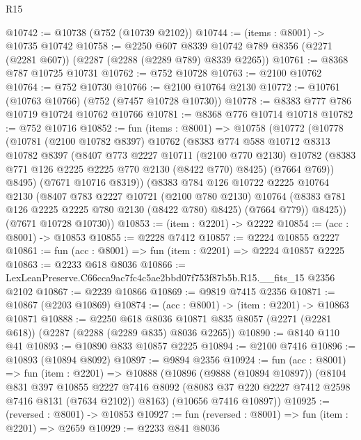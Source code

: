 \begin{lexlean}{R15}
\begin{coremodule}
@10742 := @10738 (@752 (@10739 @2102))
@10744 := (items : @8001) -> @10735 @10742
@10758 := @2250
    @607
    @8339
    @10742
    @789
    @8356
    (@2271 (@2281 @607))
    (@2287 (@2288 (@2289 @789) @8339 @2265))
@10761 := @8368 @787 @10725 @10731
@10762 := @752 @10728
@10763 := @2100 @10762
@10764 := @752 @10730
@10766 := @2100 @10764 @2130
@10772 := @10761 (@10763 @10766) (@752 (@7457 @10728 @10730))
@10778 := @8383 @777 @786 @10719 @10724 @10762 @10766
@10781 := @8368 @776 @10714 @10718
@10782 := @752 @10716
@10852 := fun (items : @8001) =>
  @10758
    (@10772
      (@10778
        (@10781
          (@2100 @10782 @8397)
          @10762
          (@8383
            @774
            @588
            @10712
            @8313
            @10782
            @8397
            (@8407
              @773
              @2227
              @10711
              (@2100 @770 @2130)
              @10782
              (@8383 @771 @126 @2225 @2225 @770 @2130 (@8422 @770) @8425)
              (@7664 @769))
            @8495)
          (@7671 @10716 @8319))
        (@8383
          @784
          @126
          @10722
          @2225
          @10764
          @2130
          (@8407
            @783
            @2227
            @10721
            (@2100 @780 @2130)
            @10764
            (@8383 @781 @126 @2225 @2225 @780 @2130 (@8422 @780) @8425)
            (@7664 @779))
          @8425))
      (@7671 @10728 @10730))
@10853 := (item : @2201) -> @2222
@10854 := (acc : @8001) -> @10853
@10855 := @2228 @7412
@10857 := @2224 @10855 @2227
@10861 := fun (acc : @8001) => fun (item : @2201) => @2224 @10857 @2225
@10863 := @2233 @618 @8036
@10866 := LexLeanPreserve.C66cca9ac7fc4c5ae2bbd07f753f87b5b.R15.__fits_15 @2356 @2102
@10867 := @2239 @10866
@10869 := @9819 @7415 @2356
@10871 := @10867 (@2203 @10869)
@10874 := (acc : @8001) -> (item : @2201) -> @10863 @10871
@10888 := @2250
    @618
    @8036
    @10871
    @835
    @8057
    (@2271 (@2281 @618))
    (@2287 (@2288 (@2289 @835) @8036 @2265))
@10890 := @8140 @110 @41
@10893 := @10890 @833 @10857 @2225
@10894 := @2100 @7416
@10896 := @10893 (@10894 @8092)
@10897 := @9894 @2356
@10924 := fun (acc : @8001) =>
  fun (item : @2201) =>
  @10888
    (@10896
      (@9888 (@10894 @10897))
      (@8104
        @831
        @397
        @10855
        @2227
        @7416
        @8092
        (@8083 @37 @220 @2227 @7412 @2598 @7416 @8131 (@7634 @2102))
        @8163)
      (@10656 @7416 @10897))
@10925 := (reversed : @8001) -> @10853
@10927 := fun (reversed : @8001) => fun (item : @2201) => @2659
@10929 := @2233 @841 @8036

\end{coremodule}
\end{lexlean}
